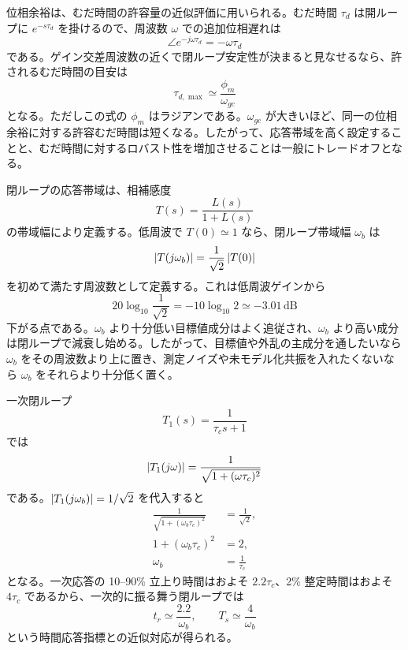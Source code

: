 位相余裕は、むだ時間の許容量の近似評価に用いられる。むだ時間 $\tau_d$ は開ループに $e^{-s\tau_d}$ を掛けるので、周波数 $\omega$ での追加位相遅れは
\begin{equation}
  \angle e^{-j\omega\tau_d}=-\omega\tau_d
\end{equation}
である。ゲイン交差周波数の近くで閉ループ安定性が決まると見なせるなら、許されるむだ時間の目安は
\begin{equation}
  \tau_{d,\max}\simeq\frac{\phi_m}{\omega_{gc}}
\end{equation}
となる。ただしこの式の $\phi_m$ はラジアンである。$\omega_{gc}$ が大きいほど、同一の位相余裕に対する許容むだ時間は短くなる。したがって、応答帯域を高く設定することと、むだ時間に対するロバスト性を増加させることは一般にトレードオフとなる。

閉ループの応答帯域は、相補感度
\begin{equation}
  T(s)=\frac{L(s)}{1+L(s)}
\end{equation}
の帯域幅により定義する。低周波で $T(0)\simeq 1$ なら、閉ループ帯域幅 $\omega_b$ は
\begin{equation}
  \left|T(j\omega_b)\right|=\frac{1}{\sqrt{2}}\left|T(0)\right|
\end{equation}
を初めて満たす周波数として定義する。これは低周波ゲインから
\begin{equation}
  20\log_{10}\frac{1}{\sqrt{2}}
  =-10\log_{10}2\simeq -3.01\,\mathrm{dB}
\end{equation}
下がる点である。$\omega_b$ より十分低い目標値成分はよく追従され、$\omega_b$ より高い成分は閉ループで減衰し始める。したがって、目標値や外乱の主成分を通したいなら $\omega_b$ をその周波数より上に置き、測定ノイズや未モデル化共振を入れたくないなら $\omega_b$ をそれらより十分低く置く。

一次閉ループ
\begin{equation}
  T_1(s)=\frac{1}{\tau_c s+1}
\end{equation}
では
\begin{equation}
  \left|T_1(j\omega)\right|=\frac{1}{\sqrt{1+(\omega\tau_c)^2}}
\end{equation}
である。$\left|T_1(j\omega_b)\right|=1/\sqrt{2}$ を代入すると
\begin{align}
  \frac{1}{\sqrt{1+(\omega_b\tau_c)^2}}&=\frac{1}{\sqrt{2}},\\
  1+(\omega_b\tau_c)^2&=2,\\
  \omega_b&=\frac{1}{\tau_c}
\end{align}
となる。一次応答の 10--90\% 立上り時間はおよそ $2.2\tau_c$、2\% 整定時間はおよそ $4\tau_c$ であるから、一次的に振る舞う閉ループでは
\begin{equation}
  t_r\simeq\frac{2.2}{\omega_b},
  \qquad
  T_s\simeq\frac{4}{\omega_b}
\end{equation}
という時間応答指標との近似対応が得られる。

